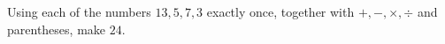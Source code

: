 Using each of the numbers $13,5,7,3$ exactly once, together with $+,-,\times,\div$ and parentheses, make $24$.
